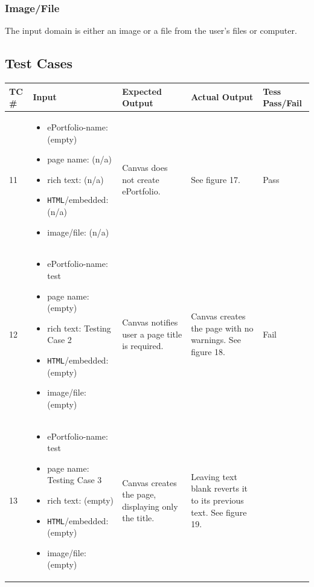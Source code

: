 \documentclass[10pt,letterpaper]{article}
\begin{document}
\subsubsection{Image/File}
The input domain is either an image or a file from the user's files or computer.

\newpage
\subsection{Test Cases}
\begin{table}[h!]
\begin{tabularx}{\textwidth}{lXXXl}
\toprule
TC \# &
  Input &
  Expected Output &
  Actual Output &
  Tess Pass/Fail \\ \midrule
11 &
  \begin{itemize}
    \item{ePortfolio-name: (empty)}
    \item{page name: (n/a)}
    \item{rich text: (n/a)}
    \item{\texttt{HTML}/embedded: (n/a)}
    \item{image/file: (n/a)}
  \end{itemize} &
   Canvas does not create ePortfolio. &
   See figure 17. &
   Pass \\ \midrule
12 &
  \begin{itemize}
    \item{ePortfolio-name: test}
    \item{page name: (empty)}
    \item{rich text: Testing Case 2}
    \item{\texttt{HTML}/embedded: (empty)}
    \item{image/file: (empty)}
  \end{itemize} &
   Canvas notifies user a page title is required. &
   Canvas creates the page with no warnings. See figure 18. &
   Fail \\ \midrule
13 &
  \begin{itemize}
    \item{ePortfolio-name: test}
    \item{page name: Testing Case 3}
    \item{rich text: (empty)}
    \item{\texttt{HTML}/embedded: (empty)}
    \item{image/file: (empty)}
  \end{itemize} &
   Canvas creates the page, displaying only the title. &
   Leaving text blank reverts it to its previous text. See figure 19. &

\end{tabularx}
\end{table}
\end{document}
